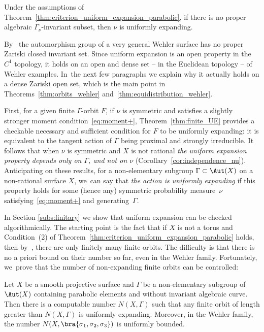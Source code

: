 \begin{cor}\label{cor:no_algebraic_invariant_subset}
Under the assumptions of Theorem~\ref{thm:criterion_uniform_expansion_parabolic}, if there is no proper algebraic $\Gamma_\nu$-invariant subset, then
$\nu$ is uniformly expanding.
\end{cor}

By~\cite[Th.\,A]{finite_orbits}
the automorphism group of a very general Wehler surface has no proper Zariski closed invariant set. Since uniform expansion is an open property in the $C^1$ topology,
it holds on an open and dense set -- in the Euclidean topology -- of Wehler examples. In~the next few paragraphs we explain why it actually holds on a dense Zariski open set,
which is the main point in Theorems~\ref{thm:orbits_wehler} and~\ref{thm:equidistribution_wehler}.

First, for a given finite $\Gamma$-orbit $F$,
if $\nu$ is symmetric and satisfies a slightly stronger moment condition~\eqref{eq:moment+}, Theorem~\ref{thm:finite_UE} provides a
checkable necessary and sufficient condition for $F$ to be uniformly expanding:
it is equivalent to the tangent action of $\Gamma$ being proximal and strongly irreducible. It
follows that when $\nu$ is symmetric and $X$ is not rational
{\emph{the uniform expansion property
depends only on $\Gamma$, and not on $\nu$}} (Corollary~\ref{cor:independence_nu}).
Anticipating on these results, for a non-elementary subgroup $\Gamma\subset\Aut(X)$ on a non-rational surface
$X$, we~can say that \emph{the action is uniformly expanding} if this property holds for some (hence any)
symmetric probability measure~$\nu$ satisfying~\eqref{eq:moment+} and
generating~$\Gamma$.

In Section \ref{subs:finitary} we show that uniform expansion can be checked algorithmically.
The starting point is the fact that if $X$ is not a torus and Condition~(2) of
Theorem~\ref{thm:criterion_uniform_expansion_parabolic} holds,
then by~\cite[Th.\,C]{finite_orbits}, there are only finitely many finite orbits.
The difficulty is that there is no a priori bound on their number so far, even in the Wehler family.
Fortunately, we~prove that the number of non-expanding finite orbits can be controlled:

\begin{pro}
Let $X$ be a smooth projective surface and $\Gamma $
be a non-elementary subgroup of $\Aut(X)$
containing parabolic elements and without invariant algebraic curve. Then there is a computable number $N(X, \Gamma)$ such that any finite orbit of length greater than $N(X, \Gamma)$ is uniformly expanding.
Moreover, in the Wehler family, the number $N(X, \bra{\sigma_1, \sigma_2, \sigma_3})$ is uniformly bounded.
\end{pro}

